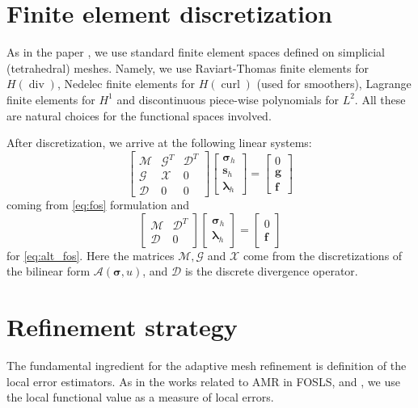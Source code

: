 \documentclass[a4paper,12pt]{amsart}
\numberwithin{equation}{section}
\newcommand{\curl}{\operatorname{curl}}
\renewcommand{\div}{\operatorname{div}}
\def\bff{{\mathbf f}}
\def\bg{{\mathbf g}}
\def\bs{{\mathbf s}}
\def\blambda{{\boldsymbol \lambda}}
\newcommand{\A}{{\mathcal A}}
\newcommand{\D}{{\mathcal D}}
\newcommand{\G}{{\mathcal G}}
\newcommand{\M}{{\mathcal M}}
\newcommand{\X}{{\mathcal X}}
\def\bsigma{{\boldsymbol \sigma}}
\begin{document}
\section{Finite element discretization}

As in the paper \cite{our_cfosls_paper}, we use standard finite element spaces defined on simplicial (tetrahedral) meshes. Namely, we use Raviart-Thomas finite elements for $H(\div)$, Nedelec finite elements for $H(\curl)$ (used for smoothers), Lagrange finite elements for $H^1$ and discontinuous piece-wise polynomials for $L^2$. All these are natural choices for the functional spaces involved.

After discretization, we arrive at the following linear systems:
\begin{equation}
\begin{bmatrix}
\M & \G^T & \D^T \\
\G & \X & 0 \\
\D & 0 & 0 
\end{bmatrix}
\begin{bmatrix}
\bsigma_h \\
\bs_h \\
\blambda_h
\end{bmatrix}
=
\begin{bmatrix}
0 \\
\bg \\
\bff
\end{bmatrix}
\label{eq:discrete_problem}
\end{equation}
coming from \eqref{eq:fos} formulation and
\begin{equation}
\begin{bmatrix}
\M & \D^T \\
\D & 0 
\end{bmatrix}
\begin{bmatrix}
\bsigma_h \\
\blambda_h
\end{bmatrix}
=
\begin{bmatrix}
0 \\
\bff
\end{bmatrix}
\label{eq:alt_discrete_problem}
\end{equation}
for \eqref{eq:alt_fos}. Here the matrices $\M, \G$ and $\X$ come from the discretizations of the bilinear form $\A(\bsigma,u)$, and $\D$ is the discrete divergence operator.

\section{Refinement strategy}
The fundamental ingredient for the adaptive mesh refinement is definition of the local error estimators. As in the works related to AMR in FOSLS, \cite{fosls_adapt} and \cite{fosls_adapt2}, we use the local functional value as a measure of local errors. 
\end{document}
